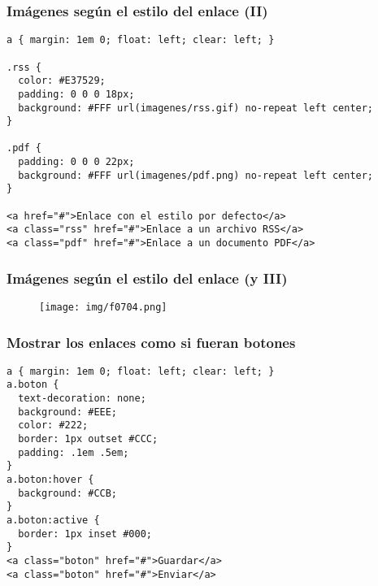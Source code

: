 
\begin{frame}[fragile]
\frametitle{Imágenes según el estilo del enlace (II)}

\begin{footnotesize}
\begin{verbatim}
a { margin: 1em 0; float: left; clear: left; }
 
.rss {
  color: #E37529;
  padding: 0 0 0 18px;
  background: #FFF url(imagenes/rss.gif) no-repeat left center;
}
 
.pdf {
  padding: 0 0 0 22px;
  background: #FFF url(imagenes/pdf.png) no-repeat left center;
}
 
<a href="#">Enlace con el estilo por defecto</a>
<a class="rss" href="#">Enlace a un archivo RSS</a>
<a class="pdf" href="#">Enlace a un documento PDF</a>
\end{verbatim}
\end{footnotesize}

\end{frame}


\begin{frame}
\frametitle{Imágenes según el estilo del enlace (y III)}


\begin{center}
\begin{figure}[p]
\texttt{[image: img/f0704.png]}
\end{figure}
\end{center}

\end{frame}



\begin{frame}[fragile]
\frametitle{Mostrar los enlaces como si fueran botones}

\begin{footnotesize}
\begin{verbatim}
a { margin: 1em 0; float: left; clear: left; }
a.boton {
  text-decoration: none;
  background: #EEE;
  color: #222;
  border: 1px outset #CCC;
  padding: .1em .5em;
}
a.boton:hover {
  background: #CCB;
}
a.boton:active {
  border: 1px inset #000;
}
<a class="boton" href="#">Guardar</a>
<a class="boton" href="#">Enviar</a>
\end{verbatim}
\end{footnotesize}

\end{frame}


